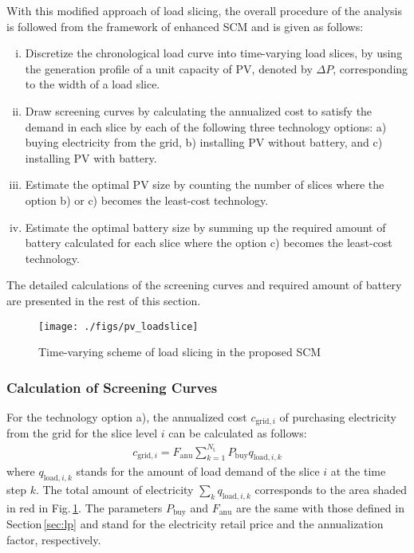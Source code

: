 \documentclass[lettersize,journal]{IEEEtran}
\newcommand{\figref}[1]{Fig.\,\ref{#1}}
\newcommand{\secref}[1]{Section\,\ref{#1}}
\begin{document}
%
With this modified approach of load slicing, the overall procedure of the analysis is followed from the framework of enhanced SCM and is given as follows:
\begin{enumerate}[(i)]
 \setlength{\parskip}{0cm} 
 \setlength{\itemsep}{0.1cm}  
 \item Discretize the chronological load curve into time-varying load slices, by using the generation profile of a unit capacity of PV, denoted by $\Delta P$, corresponding to the width of a load slice.   
 \item Draw screening curves by calculating the annualized cost to satisfy the demand in each slice by each of the following three technology options: a) buying electricity from the grid, b) installing PV without battery, and c) installing PV with battery. 
 \item Estimate the optimal PV size by counting the number of slices where the option b) or c) becomes the least-cost technology. 
 \item Estimate the optimal battery size by summing up the required amount of battery calculated for each slice where the option c) becomes the least-cost technology.  
\end{enumerate}
The detailed calculations of the screening curves and required amount of battery are presented in the rest of this section. 

\begin{figure}[t]
 \centering
 \texttt{[image: ./figs/pv\_loadslice]}
 \caption{Time-varying scheme of load slicing in the proposed SCM} \label{fig:pv_load_slice}
\end{figure}


\subsubsection{Calculation of Screening Curves}

For the technology option a), the annualized cost $c_{\mathrm{grid},i}$ of purchasing electricity from the grid for the slice level $i$ can be calculated as follows: 
\begin{align} \label{eq:cost_grid}
 c_{\mathrm{grid}, i} = F_\mathrm{anu} \sum_{k=1}^{N_\mathrm{t}} P_\mathrm{buy}  q_{\mathrm{load}, i,k}
\end{align}
where $q_{\mathrm{load},i,k}$ stands for the amount of load demand of the slice $i$ at the time step $k$. 
The total amount of electricity $\sum_k q_{\mathrm{load}, i,k}$ corresponds to the area shaded in red in \figref{fig:pv_load_slice}. 
The parameters $P_\mathrm{buy}$ and $F_\mathrm{anu}$ are the same with those defined in \secref{sec:lp} and stand for the electricity retail price and the annualization factor, respectively. 
\end{document}

